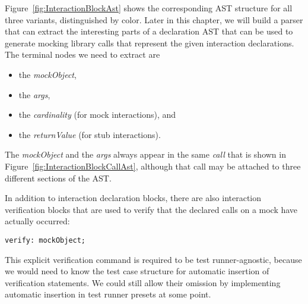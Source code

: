 Figure~\ref{fig:InteractionBlockAst} shows the corresponding AST structure
for all three variants, distinguished by color.
Later in this chapter, we will build a parser that can extract
the interesting parts of a declaration AST
that can be used to generate mocking library calls
that represent the given interaction declarations.
The terminal nodes we need to extract are
\begin{itemize}
  \item the \textit{mockObject},
  \item the \textit{args},
  \item the \textit{cardinality} (for mock interactions), and
  \item the \textit{returnValue} (for stub interactions).
\end{itemize}
The \textit{mockObject} and the \textit{args} always appear
in the same  \textit{call}
that is shown in Figure~\ref{fig:InteractionBlockCallAst},
although that call may be attached to three different sections of the AST.

In addition to interaction declaration blocks,
there are also interaction verification blocks
that are used to verify that the declared calls on a mock
have actually occurred:
\begin{verbatim}
verify: mockObject;
\end{verbatim}
This explicit verification command is required to be test runner-agnostic,
because we would need to know the test case structure
for automatic insertion of verification statements.
We could still allow their omission by implementing automatic insertion
in test runner presets at some point.
